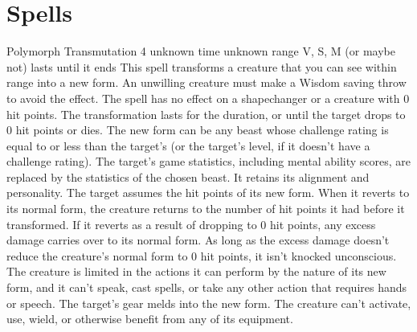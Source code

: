 \documentclass[10pt,a4paper,twoside,bg=print,twocolumn,openany,nodeprecatedcode]{dndbook}
\begin{document}
\chapter{Spells}
\DndSpellHeader%
{Polymorph}
{Transmutation 4}
{unknown time}
{unknown range}
{V, S, M (or maybe not)}
{lasts until it ends}
This spell transforms a creature that you can see within range into a new form. An unwilling creature must make a Wisdom saving throw to avoid the effect. The spell has no effect on a shapechanger or a creature with 0 hit points.
The transformation lasts for the duration, or until the target drops to 0 hit points or dies. The new form can be any beast whose challenge rating is equal to or less than the target's (or the target's level, if it doesn't have a challenge rating). The target's game statistics, including mental ability scores, are replaced by the statistics of the chosen beast. It retains its alignment and personality.
The target assumes the hit points of its new form. When it reverts to its normal form, the creature returns to the number of hit points it had before it transformed. If it reverts as a result of dropping to 0 hit points, any excess damage carries over to its normal form. As long as the excess damage doesn't reduce the creature's normal form to 0 hit points, it isn't knocked unconscious.
The creature is limited in the actions it can perform by the nature of its new form, and it can't speak, cast spells, or take any other action that requires hands or speech.
The target's gear melds into the new form. The creature can't activate, use, wield, or otherwise benefit from any of its equipment.
\end{document}
